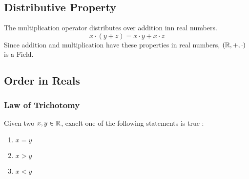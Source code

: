 \documentclass{scrartcl}
\begin{document}
    \subsection{Distributive Property}
    The multiplication operator distributes over addition inn real numbers.
    $$x \cdot (y + z) = x \cdot y + x \cdot z$$
    Since addition and multiplication have these properties in real numbers, $(\mathbb{R}, +, \cdot)$ is a Field.
    \subsection{Order in Reals}
    \subsubsection{Law of Trichotomy}
    Given two $x, y \in \mathbb{R}$, exaclt one of the following statements is true :
    \begin{enumerate}[label={(\roman*)}]
        \item $x = y$
        \item $x > y$
        \item $x < y$
    \end{enumerate}
\end{document}
